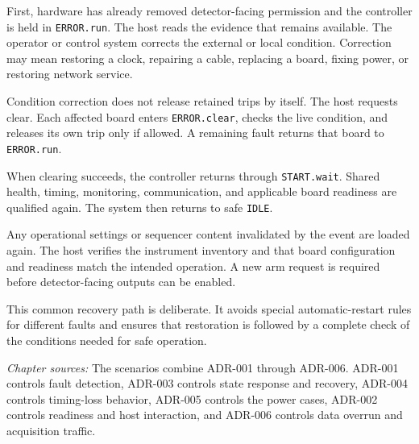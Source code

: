 First, hardware has already removed detector-facing permission and the controller is held in \texttt{ERROR.run}. The host reads the evidence that remains available. The operator or control system corrects the external or local condition. Correction may mean restoring a clock, repairing a cable, replacing a board, fixing power, or restoring network service.

Condition correction does not release retained trips by itself. The host requests clear. Each affected board enters \texttt{ERROR.clear}, checks the live condition, and releases its own trip only if allowed. A remaining fault returns that board to \texttt{ERROR.run}.

When clearing succeeds, the controller returns through \texttt{START.wait}. Shared health, timing, monitoring, communication, and applicable board readiness are qualified again. The system then returns to safe \texttt{IDLE}.

Any operational settings or sequencer content invalidated by the event are loaded again. The host verifies the instrument inventory and that board configuration and readiness match the intended operation. A new arm request is required before detector-facing outputs can be enabled.

This common recovery path is deliberate. It avoids special automatic-restart rules for different faults and ensures that restoration is followed by a complete check of the conditions needed for safe operation.

\medskip
\noindent\textit{Chapter sources:} The scenarios combine ADR-001 through ADR-006. ADR-001 controls fault detection, ADR-003 controls state response and recovery, ADR-004 controls timing-loss behavior, ADR-005 controls the power cases, ADR-002 controls readiness and host interaction, and ADR-006 controls data overrun and acquisition traffic.

